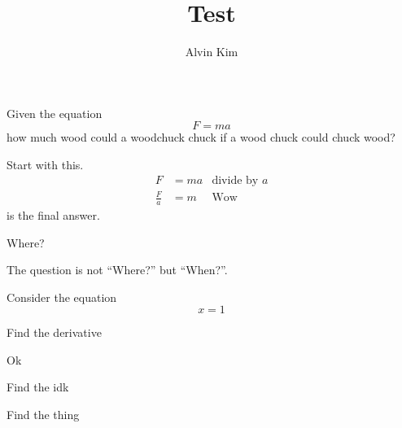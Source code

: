 \documentclass{article}
\title{Test}
\author{Alvin Kim}
\begin{document}
\maketitle
\tableofcontents

\begin{problem}
    Given the equation
    \[F = ma\]
    how much wood could a woodchuck chuck if a wood chuck could chuck wood?
    \begin{solution}
        Start with this.
        \begin{align}
            F           & = ma        & \text{divide by \(a\)} \\
            \frac{F}{a} & = \boxed{m} & \text{Wow}
        \end{align}
         is the final answer.
    \end{solution}
\end{problem}

\begin{problem}
    Where?
    \begin{solution}
        The question is not ``Where?'' but ``When?''.
    \end{solution}
\end{problem}

\begin{problem}
    Consider the equation
    \[x = 1\]

    \begin{subproblem}
        Find the derivative
        \begin{solution}
            Ok
        \end{solution}
    \end{subproblem}

    \begin{subproblem}
        Find the idk
    \end{subproblem}

    \begin{subproblem}
        Find the thing
    \end{subproblem}
\end{problem}

\begin{problem}
    \lipsum[1]

    \begin{solution}
        \lipsum[2]
    \end{solution}
\end{problem}
\end{document}
